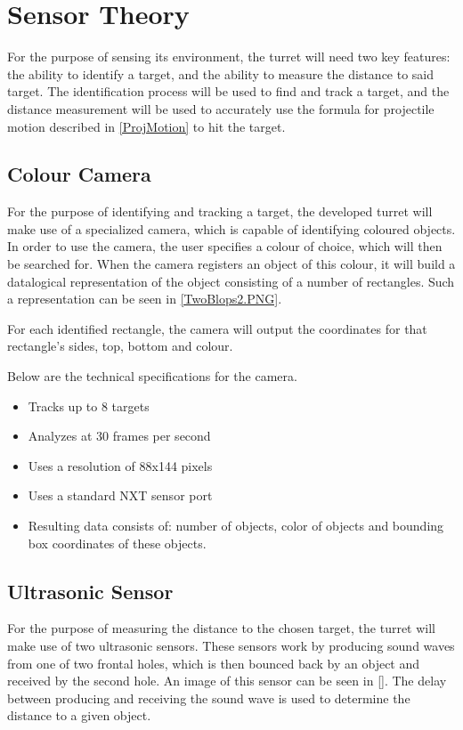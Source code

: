 \section{Sensor Theory}\label{SensorTheory}
For the purpose of sensing its environment, the turret will need two key
features: the ability to identify a target, and the ability to measure the
distance to said target. The identification process will be used to find and
track a target, and the distance measurement will be used to accurately use the
formula for projectile motion described in \autoref{ProjMotion} to hit the
target.

\subsection{Colour Camera}
For the purpose of identifying and tracking a target, the developed turret will
make use of a specialized camera, which is capable of identifying coloured
objects. In order to use the camera, the user specifies a colour of choice,
which will then be searched for. When the camera registers an object of this
colour, it will build a datalogical representation of the object consisting of a
number of rectangles. Such a representation can be seen in
\autoref{TwoBlops2.PNG}.


For each identified rectangle, the camera will output the coordinates for that
rectangle's sides, top, bottom and colour. 

Below are the technical specifications\citep[p. 1]{NXTCam} for the camera.
\begin{itemize}
  \item Tracks up to 8 targets
  \item Analyzes at 30 frames per second
  \item Uses a resolution of 88x144 pixels
  \item Uses a standard NXT sensor port
  \item Resulting data consists of: number of objects, color of objects and
  bounding box coordinates of these objects.
\end{itemize}

\subsection{Ultrasonic Sensor}
For the purpose of measuring the distance to the chosen target, the turret will
make use of two ultrasonic sensors. These sensors work by producing sound waves
from one of two frontal holes, which is then bounced back by an object and
received by the second hole. An image of this sensor can be seen in \autoref{}.
The delay between producing and receiving the sound wave is used to determine
the distance to a given object.

